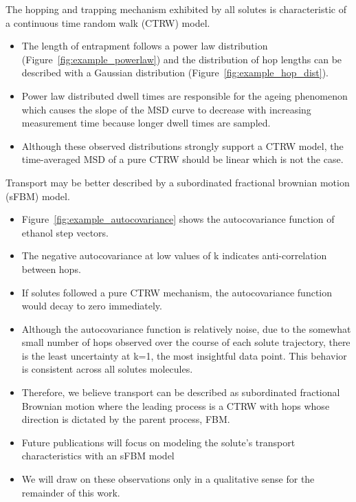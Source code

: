 \documentclass{article}
\begin{document}
  \noindent The hopping and trapping mechanism exhibited by all solutes is characteristic of
  a continuous time random walk (CTRW) model.	
  \begin{itemize}
  	\item The length of entrapment follows a power law distribution 
  	(Figure~\ref{fig:example_powerlaw}) and the distribution of hop lengths can be 
  	described with a Gaussian distribution (Figure~\ref{fig:example_hop_dist}).
  	\item Power law distributed dwell times are responsible for the ageing phenomenon
  	which causes the slope of the MSD curve to decrease with increasing measurement
  	time because longer dwell times are sampled.  %
 	\item Although these observed distributions strongly support a CTRW model, the time-averaged
 	MSD of a pure CTRW should be linear which is not the case.~\cite{neusius_subdiffusion_2008,meroz_subdiffusion_2010}
  \end{itemize}
  
  \noindent Transport may be better described by a subordinated fractional brownian motion 
  (sFBM) model.
  \begin{itemize}
  	\item Figure~\ref{fig:example_autocovariance} shows the autocovariance function of 
  	ethanol step vectors. %
  	\item The negative autocovariance at low values of k indicates anti-correlation
  	between hops. 
  	\item If solutes followed a pure CTRW mechanism, the autocovariance function would
  	decay to zero immediately.
  	\item Although the autocovariance function is relatively noise, due to the somewhat small
  	number of hops observed over the course of each solute trajectory, there is the least 
  	uncertainty at k=1, the most insightful data point. This behavior is consistent across
  	all solutes molecules. %
  	\item Therefore, we believe transport can be described as subordinated fractional Brownian
  	motion where the leading process is a CTRW with hops whose direction is dictated by the parent
  	process, FBM.
  	\item Future publications will focus on modeling the solute's transport characteristics
  	with an sFBM model
  	\item We will draw on these observations only in a qualitative sense for the remainder of this work.
  \end{itemize}
  
\end{document}
